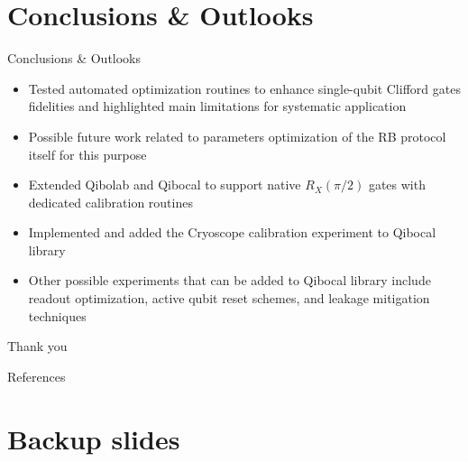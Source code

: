 \documentclass[aspectratio=169,10pt]{beamer}
\begin{document}
\section{Conclusions \& Outlooks}

\begin{frame}{Conclusions \& Outlooks}
  \begin{itemize}[label={\raisebox{0.2ex}{\tiny$\bullet$}}]
    \item Tested automated optimization routines to enhance single-qubit Clifford gates fidelities and highlighted main limitations for systematic application
    \item Possible future work related to parameters optimization of the RB protocol itself for this purpose
    \item Extended Qibolab and Qibocal to support native $R_X(\pi/2)$ gates with dedicated calibration routines
    \item Implemented and added the Cryoscope calibration experiment to Qibocal library 
    \item Other possible experiments that can be added to Qibocal library include readout optimization, active qubit reset schemes, and leakage mitigation techniques 
  \end{itemize}
\end{frame}

\begin{frame}[t,standout]
\Large
Thank you
\end{frame}


\begin{frame}{References}
    \printbibliography
\end{frame}


\section*{Backup slides}
\end{document}
